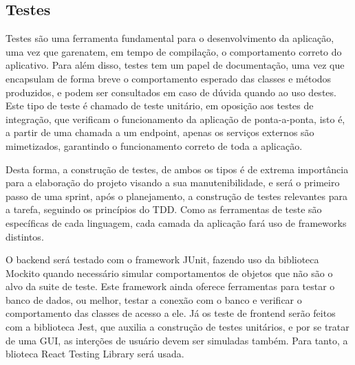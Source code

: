 \subsection{Testes}

Testes são uma ferramenta fundamental para o desenvolvimento da
aplicação, uma vez que garenatem, em tempo de compilação, o
comportamento correto do aplicativo. Para além disso, testes tem um
papel de documentação, uma vez que encapsulam de forma breve o
comportamento esperado das classes e métodos produzidos, e podem ser
consultados em caso de dúvida quando ao uso destes. Este tipo de teste
é chamado de teste unitário, em oposição aos testes de integração, que
verificam o funcionamento da aplicação de ponta-a-ponta, isto é, a
partir de uma chamada a um endpoint, apenas os serviços externos são
mimetizados, garantindo o funcionamento correto de toda a aplicação.

Desta forma, a construção de testes, de ambos os tipos é de extrema
importância para a elaboração do projeto visando a sua
manutenibilidade, e será o primeiro passo de uma sprint, após o
planejamento, a construção de testes relevantes para a tarefa,
seguindo os princípios do TDD\cite{TDD}. Como as ferramentas de teste são
específicas de cada linguagem, cada camada da aplicação fará uso de
frameworks distintos.

O \gls{backend} será testado com o framework JUnit, fazendo uso da
biblioteca Mockito quando necessário simular comportamentos de objetos
que não são o alvo da suite de teste. Este framework ainda oferece
ferramentas para testar o banco de dados, ou melhor, testar a conexão
com o banco e verificar o comportamento das classes de acesso a ele.
Já os teste de \gls{frontend} serão feitos com a biblioteca Jest,
que auxilia a construção de testes unitários, e por se tratar de uma
\gls{GUI}, as interções de usuário devem ser simuladas também. Para tanto, a
blioteca React Testing Library será usada.

